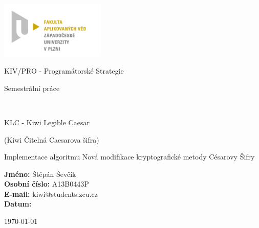 \documentclass[12pt,a4paper]{article}
\author{Jan Šmejkal}
\begin{document}
\begin{titlepage}

\includegraphics[width=50mm]{img/FAV.jpg}
\\[160 pt]
\centerline{ \Huge \sc KIV/PRO - Programátorské Strategie}
\centerline{ \huge \sc Semestrální práce}
\\[12 pt]
{\large \sc
\centerline{\LARGE{KLC - Kiwi Legible Caesar}}
\centerline{(Kiwi Čitelná Caesarova šifra)}
\centerline{\small{Implementace algoritmu Nová modifikace kryptografické metody Césarovy Šifry}}
}


{
\vfill 
\parindent=0cm
\textbf{Jméno:} Štěpán Ševčík\\
\textbf{Osobní číslo:} A13B0443P\\
\textbf{E-mail:} kiwi@students.zcu.cz\\
\textbf{Datum:} {\large \today\par} %

}

\end{titlepage}

\newpage
\setcounter{page}{2}
\setcounter{tocdepth}{3}
\tableofcontents

\end{document}
